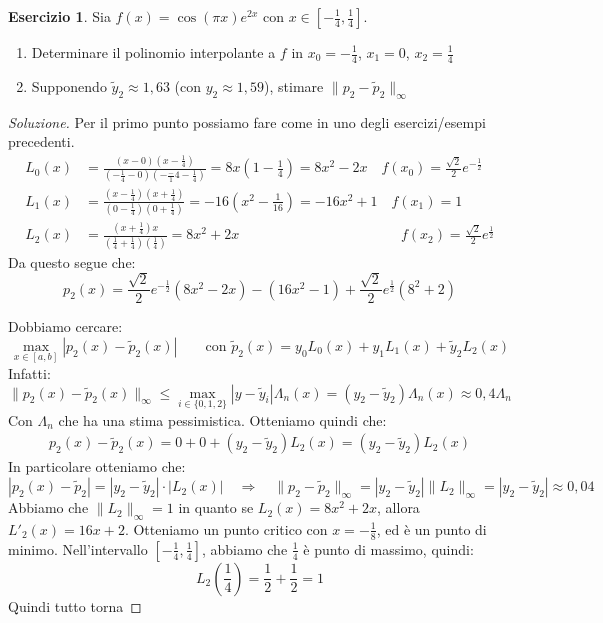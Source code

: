 \documentclass[11pt,a4paper,twoside]{article}
\theoremstyle{definition}
\newtheorem*{ese}{Esercizio}
\newenvironment{sol}
	{\renewcommand\qedsymbol{$\blacksquare$}\begin{proof}[Soluzione]}
	{\end{proof}}
\begin{document}
\begin{ese}
	Sia $f(x) = \cos(\pi x)e^{2x}$ con $x \in [-\frac 14, \frac 14]$.
	\begin{enumerate}
		\item Determinare il polinomio interpolante a $f$ in $x_0 = -\frac 14$, $x_1=0$, $x_2 = \frac 14$
		\item Supponendo $\tilde y_2 \approx 1,63$ (con $y_2 \approx 1,59$), stimare $\|p_2 - \tilde p_2\|_\infty$
	\end{enumerate}
\end{ese}

\begin{sol}
	 Per il primo punto possiamo fare come in uno degli esercizi/esempi precedenti.
	\begin{align*}
		L_0(x) &= \frac{(x-0)(x-\frac 14)}{(-\frac 14 - 0)(-\frac -14-\frac 14)} = 8x \left(1 - \frac 14\right) = 8x^2 - 2x \quad f(x_0) = \frac{\sqrt 2}2 e^{-\frac 12}\\
		L_1(x) &= \frac{(x-\frac 14)(x+\frac 14)}{(0-\frac 14)(0+ \frac 14)} = -16\left( x^2 - \frac 1{16} \right) = -16x^2 + 1\quad f(x_1) = 1\\
		L_2(x) &= \frac{(x + \frac 14)x}{(\frac 14 + \frac 14)(\frac 14)} = 8x^2 + 2x \qquad \qquad \qquad\qquad \qquad \quad \;\; f(x_2) = \frac{\sqrt 2}2 e^{\frac 12}
	\end{align*}
	Da questo segue che:
	\[ p_2(x) = \frac{\sqrt 2}2 e^{-\frac 12}\left( 8x^2-2x \right) - (16x^2 - 1) + \frac{\sqrt 2}2 e^{\frac 12} ( 8^2 + 2 ) \]

	 Dobbiamo cercare:
	\[\max_{x \in [a,b]} |p_2(x) - \tilde p_2(x)|\qquad \text{con }\tilde p_2(x) = y_0L_0(x)  +y_1L_1(x) + \tilde y_2 L_2(x)\]
	Infatti:
	\[ \| p_2(x) - \tilde p_2(x) \|_\infty \leq \max_{i \in \{0,1,2\}}|y-\tilde y_i|\Lambda_n(x) = (y_2 - \tilde y_2)\Lambda_n(x) \approx 0,4 \Lambda_n \]
	Con $\Lambda_n$ che ha una stima pessimistica. Otteniamo quindi che:
	\begin{align*}
		p_2(x) - \tilde p_2(x) = 0+0+(y_2-\tilde y_2) L_2(x) = (y_2 - \tilde y_2)L_2(x)
	\end{align*}
	In particolare otteniamo che:
	\[ |p_2(x) - \tilde p_2| = |y_2-\tilde y_2|\cdot |L_2(x)| \quad \Rightarrow \quad \|p_2 - \tilde p_2\|_\infty = |y_2 - \tilde y_2|\|L_2\|_\infty = |y_2 - \tilde y_2| \approx 0,04 \]
	Abbiamo che $\|L_2\|_\infty = 1$ in quanto se $L_2(x) = 8x^2 + 2x$, allora $L'_2(x) = 16x + 2$. Otteniamo un punto critico con $x= -\frac 18$, ed è un punto di minimo. Nell'intervallo $[-\frac 14, \frac 14]$, abbiamo che $\frac 14$ è punto di massimo, quindi:
	\[ L_2\left(\frac 14\right) = \frac 12 + \frac 12 = 1 \]
	Quindi tutto torna
\end{sol}
\end{document}
